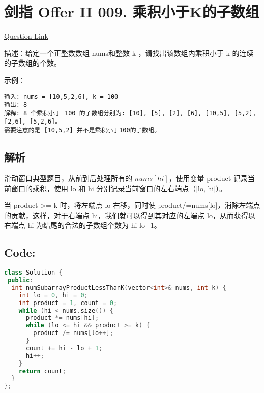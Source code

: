 ﻿\section{剑指 Offer II 009. 乘积小于K的子数组}

\href{https://leetcode.cn/problems/ZVAVXX}{Question Link}

描述：给定一个正整数数组 nums和整数 k ，请找出该数组内乘积小于 k 的连续的子数组的个数。

示例：

\begin{lstlisting}
输入: nums = [10,5,2,6], k = 100
输出: 8
解释: 8 个乘积小于 100 的子数组分别为: [10], [5], [2], [6], [10,5], [5,2], [2,6], [5,2,6]。
需要注意的是 [10,5,2] 并不是乘积小于100的子数组。
\end{lstlisting}


\subsection{解析}

滑动窗口典型题目，从前到后处理所有的 $nums[hi]$，使用变量 product 记录当前窗口的乘积，使用 lo 和 hi 分别记录当前窗口的左右端点（[lo, hi]）。

当 product >= k 时，将左端点 lo 右移，同时使 product/=nums[lo]，消除左端点的贡献，这样，对于右端点 hi，我们就可以得到其对应的左端点 lo，从而获得以右端点 hi 为结尾的合法的子数组个数为 hi-lo+1。

\subsection*{Code:}

\begin{lstlisting}[language=C++]
class Solution {
 public:
  int numSubarrayProductLessThanK(vector<int>& nums, int k) {
    int lo = 0, hi = 0;
    int product = 1, count = 0;
    while (hi < nums.size()) {
      product *= nums[hi];
      while (lo <= hi && product >= k) {
        product /= nums[lo++];
      }
      count += hi - lo + 1;
      hi++;
    }
    return count;
  }
};
\end{lstlisting}
